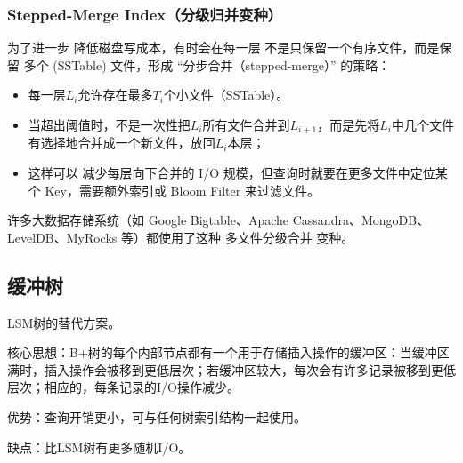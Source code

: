 \subsubsection{Stepped-Merge Index（分级归并变种）}

为了进一步 降低磁盘写成本，有时会在每一层 不是只保留一个有序文件，而是保留 多个 (SSTable) 文件，形成 “分步合并（stepped-merge）” 的策略：

\begin{itemize}
    \item 每一层$L_i$允许存在最多$T_i$个小文件（SSTable）。
    \item 当超出阈值时，不是一次性把$L_i$所有文件合并到$L_{i+1}$，而是先将$L_i$中几个文件有选择地合并成一个新文件，放回$L_i$本层；
    \item 这样可以 减少每层向下合并的 I/O 规模，但查询时就要在更多文件中定位某个 Key，需要额外索引或 Bloom Filter 来过滤文件。
\end{itemize}

许多大数据存储系统（如 Google Bigtable、Apache Cassandra、MongoDB、LevelDB、MyRocks 等）都使用了这种 多文件分级合并 变种。

\subsection{缓冲树}

LSM树的替代方案。

核心思想：B+树的每个内部节点都有一个用于存储插入操作的缓冲区：当缓冲区满时，插入操作会被移到更低层次；若缓冲区较大，每次会有许多记录被移到更低层次；相应的，每条记录的I/O操作减少。

优势：查询开销更小，可与任何树索引结构一起使用。

缺点：比LSM树有更多随机I/O。
